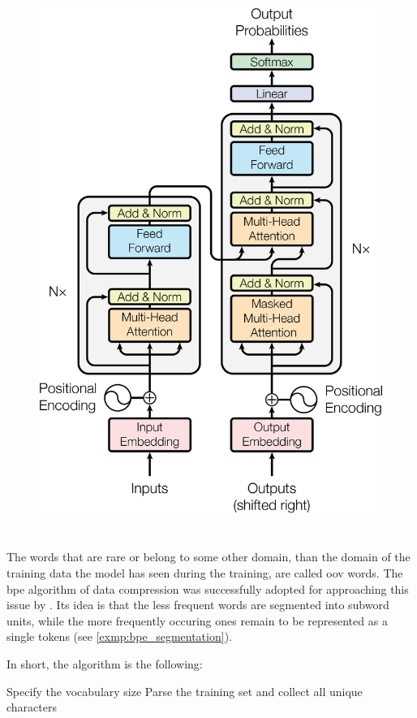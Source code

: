 \begin{figure}[h]
	\centering
	\includegraphics[width=0.5\columnwidth]{img/transformer_architecture.png}
	 {}
	\label{fig:transformer_architecture}
\end{figure}


\section{}
\label{section:bpe}

The words that are rare or belong to some other domain, than the domain
of the training data the model has seen during the training, are called
\acrshort{oov} words.
The \acrfull{bpe} algorithm  of data compression
was successfully adopted for approaching this issue by .
Its idea is that the less frequent words are segmented into subword units,
while the more frequently occuring ones remain to be represented as a single
tokens (see \cref{exmp:bpe_segmentation}).

In short, the algorithm is the following:
\begin{outline}
	\1 Specify the vocabulary size
	\1 Parse the training set and collect all unique characters

\end{outline}

